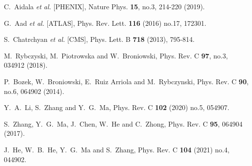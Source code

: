 \documentclass[aps,prc,twocolumn,floatfix,12pts,superscriptaddress]{revtex4}
\begin{document}
{{\begin{thebibliography}{99}
C.~Aidala \textit{et al.} [PHENIX],
Nature Phys. \textbf{15}, no.3, 214-220 (2019).

G.~Aad \textit{et al.} [ATLAS],
Phys. Rev. Lett. \textbf{116} (2016) no.17, 172301.


S.~Chatrchyan \textit{et al.} [CMS],
Phys. Lett. B \textbf{718} (2013), 795-814.

M.~Rybczyski, M.~Piotrowska and W.~Broniowski,
Phys. Rev. C \textbf{97}, no.3, 034912 (2018).

P.~Bozek, W.~Broniowski, E.~Ruiz Arriola and M.~Rybczynski,
Phys. Rev. C \textbf{90}, no.6, 064902 (2014).

Y.~A.~Li, S.~Zhang and Y.~G.~Ma,
Phys. Rev. C \textbf{102} (2020) no.5, 054907.

S.~Zhang, Y.~G.~Ma, J.~Chen, W.~He and C.~Zhong,
Phys. Rev. C \textbf{95}, 064904 (2017).

J.~He, W.~B.~He, Y.~G.~Ma and S.~Zhang,
Phys. Rev. C \textbf{104} (2021) no.4, 044902.



\end{thebibliography}}}
\end{document}
